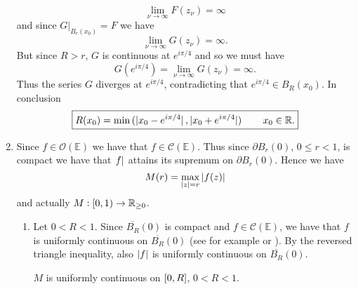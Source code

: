 \begin{enumerate}[label = \textbf{Exercise \arabic*.},wide = 0pt, itemsep=1.5ex]
		\begin{equation}
			\lim_{\nu \to \infty}F(z_\nu) = \infty
		\end{equation}
		\noindent and since $G\vert_{B_r(x_0)} = F$ we have
		\begin{equation}
			\lim_{\nu \to \infty} G(z_\nu) = \infty.	
		\end{equation}
		\noindent But since $R > r$, $G$ is continuous at $e^{i\pi/4}$ and so we must have
		\begin{equation}
			G(e^{i\pi/4}) = \lim_{\nu \to \infty}G(z_\nu) = \infty.
		\end{equation}
		Thus the series $G$ diverges at $e^{i\pi/4}$, contradicting that $e^{i\pi/4} \in B_R(x_0)$. In conclusion 
		\begin{equation}
			\boxed{R(x_0) = \min\del[0]{\abs[0]{x_0 - e^{i\pi/4}},\abs[0]{x_0 + e^{i\pi/4}}} \qquad x_0 \in \mathbb{R}.}
		\end{equation}

	\item
		Since $f \in \mathcal{O}(\mathbb{E})$ we have that $f \in \mathscr{C}(\mathbb{E})$. Thus since $\partial B_r(0)$, $0 \leq r < 1$, is compact we have that $\abs{f}$ attains its supremum on $\partial B_r(0)$. Hence we have 
				\begin{equation}
					M(r) = \max_{\abs[0]{z} = r} \abs[0]{f(z)}
				\end{equation}
				\noindent and actually $M: \intco{0,1} \to \mathbb{R}_{\geq 0}$.
		\begin{enumerate}[label = (\roman*),wide = 0pt, itemsep=1.5ex]
			\item Let $0 < R < 1$. Since $\overline{B_R}(0)$ is compact and $f \in \mathscr{C}(\mathbb{E})$, we have that $f$ is uniformly continuous on $\overline{B_R}(0)$ (see for example \cite[138]{alt2016linear} or \cite[215]{lee:topological_manifolds:2011}). By the reversed triangle inequality, also $\abs[0]{f}$ is uniformly continuous on $\overline{B_R}(0)$. 
				\begin{proposition}
					$M$ is uniformly continuous on $\intcc{0,R}$, $0 < R < 1$.
					\label{prop:M_uniform}
				\end{proposition}


\end{enumerate}
\end{enumerate}
